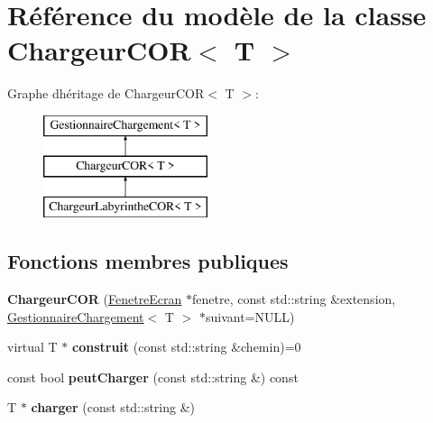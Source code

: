 \hypertarget{class_chargeur_c_o_r}{}\section{Référence du modèle de la classe Chargeur\+C\+OR$<$ T $>$}
\label{class_chargeur_c_o_r}
Graphe d\textquotesingle{}héritage de Chargeur\+C\+OR$<$ T $>$\+:\begin{figure}[H]
\begin{center}
\leavevmode
\includegraphics[height=3.000000cm]{class_chargeur_c_o_r}
\end{center}
\end{figure}
\subsection*{Fonctions membres publiques}
\begin{DoxyCompactItemize}
\item 
\mbox{\label{class_chargeur_c_o_r_ac5f2427396471858b3a068420d9c5acc}} 
{\bfseries Chargeur\+C\+OR} (\mbox{\hyperlink{class_fenetre_ecran}{Fenetre\+Ecran}} $\ast$fenetre, const std\+::string \&extension, \mbox{\hyperlink{class_gestionnaire_chargement}{Gestionnaire\+Chargement}}$<$ T $>$ $\ast$suivant=N\+U\+LL)
\item 
\mbox{\label{class_chargeur_c_o_r_a4480dc1820753d58bf702a716769b54f}} 
virtual T $\ast$ {\bfseries construit} (const std\+::string \&chemin)=0
\item 
\mbox{\label{class_chargeur_c_o_r_ae79cf231987aaefce44f7e554941d9eb}} 
const bool {\bfseries peut\+Charger} (const std\+::string \&) const
\item 
\mbox{\label{class_chargeur_c_o_r_a2271c1444eeb96e6a7331f4b611187ad}} 
T $\ast$ {\bfseries charger} (const std\+::string \&)
\end{DoxyCompactItemize}
